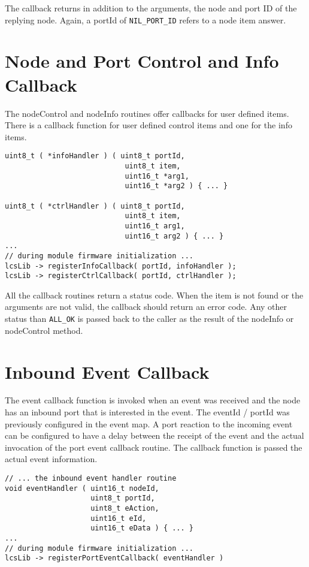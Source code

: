 The callback returns in addition to the arguments, the node and port ID of the replying node. Again, a portId of \texttt{NIL\_PORT\_ID} refers to a node item answer.

\section{Node and Port Control and Info Callback}

The nodeControl and nodeInfo routines offer callbacks for user defined items. There is a callback function for user defined control items and one for the info items.

\lstset{style=codesnippetstyle}
\begin{lstlisting}
uint8_t ( *infoHandler ) ( uint8_t portId, 
                            uint8_t item, 
                            uint16_t *arg1, 
                            uint16_t *arg2 ) { ... }

uint8_t ( *ctrlHandler ) ( uint8_t portId, 
                            uint8_t item, 
                            uint16_t arg1, 
                            uint16_t arg2 ) { ... }
...
// during module firmware initialization ...
lcsLib -> registerInfoCallback( portId, infoHandler );
lcsLib -> registerCtrlCallback( portId, ctrlHandler );
\end{lstlisting}

All the callback routines return a status code. When the item is not found or the arguments are not valid, the callback should return an error code. Any other status than \texttt{ALL\_OK} is passed back to the caller as the result of the nodeInfo or nodeControl method.

\section{Inbound Event Callback}

The event callback function is invoked when an event was received and the node has an inbound port that is interested in the event. The eventId / portId was previously configured in the event map. A port reaction to the incoming event can be configured to have a delay between the receipt of the event and the actual invocation of the port event callback routine. The callback function is passed the actual event information.

\lstset{style=codesnippetstyle}
\begin{lstlisting}
// ... the inbound event handler routine
void eventHandler ( uint16_t nodeId, 
                    uint8_t portId, 
                    uint8_t eAction,
                    uint16_t eId, 
                    uint16_t eData ) { ... }
...
// during module firmware initialization ...
lcsLib -> registerPortEventCallback( eventHandler )
\end{lstlisting}

